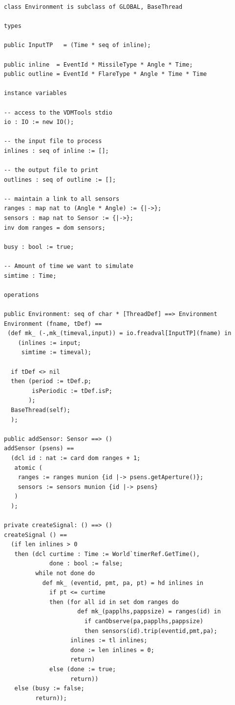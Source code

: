 \documentclass{overturerepchap}
\begin{document}
\begin{lstlisting}
class Environment is subclass of GLOBAL, BaseThread

types

public InputTP   = (Time * seq of inline);

public inline  = EventId * MissileType * Angle * Time;
public outline = EventId * FlareType * Angle * Time * Time

instance variables

-- access to the VDMTools stdio
io : IO := new IO();

-- the input file to process
inlines : seq of inline := [];

-- the output file to print
outlines : seq of outline := [];

-- maintain a link to all sensors
ranges : map nat to (Angle * Angle) := {|->};
sensors : map nat to Sensor := {|->};
inv dom ranges = dom sensors;

busy : bool := true;

-- Amount of time we want to simulate
simtime : Time;

operations

public Environment: seq of char * [ThreadDef] ==> Environment
Environment (fname, tDef) ==
 (def mk_ (-,mk_(timeval,input)) = io.freadval[InputTP](fname) in
    (inlines := input;
     simtime := timeval);
     
  if tDef <> nil
  then (period := tDef.p;
        isPeriodic := tDef.isP;
       );
  BaseThread(self);
  );

public addSensor: Sensor ==> ()
addSensor (psens) ==
  (dcl id : nat := card dom ranges + 1;
   atomic (
    ranges := ranges munion {id |-> psens.getAperture()};
    sensors := sensors munion {id |-> psens} 
   )
  );

private createSignal: () ==> () 
createSignal () ==
  (if len inlines > 0
   then (dcl curtime : Time := World`timerRef.GetTime(), 
             done : bool := false;
         while not done do
           def mk_ (eventid, pmt, pa, pt) = hd inlines in
             if pt <= curtime
             then (for all id in set dom ranges do
                     def mk_(papplhs,pappsize) = ranges(id) in
                       if canObserve(pa,papplhs,pappsize)
                       then sensors(id).trip(eventid,pmt,pa);
                   inlines := tl inlines;
                   done := len inlines = 0;
                   return) 
             else (done := true;
                   return))
   else (busy := false;
         return));


\end{lstlisting}
\end{document}

